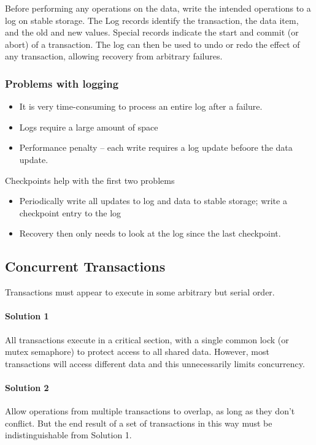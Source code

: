 \documentclass{article}
\begin{document}
Before performing any operations on the data, write the intended operations to a log on stable storage. The Log records identify the transaction, the data item, and the old and new values. Special records indicate the start and commit (or abort) of a transaction. The log can then be used to undo or redo the effect of any transaction, allowing recovery from arbitrary failures.

\subsubsection{Problems with logging}

\begin{itemize}
  \item It is very time-consuming to process an entire log after a failure.
  \item Logs require a large amount of space
  \item Performance penalty -- each write requires a log update befoore the data update.
\end{itemize}

Checkpoints help with the first two problems
\begin{itemize}
  \item Periodically write all updates to log and data to stable storage; write a checkpoint entry to the log
  \item Recovery then only needs to look at the log since the last checkpoint.
\end{itemize}

\subsection{Concurrent Transactions}

Transactions must appear to execute in some arbitrary but serial order.

\paragraph{Solution 1} All transactions execute in a critical section, with a single common lock (or mutex semaphore) to protect access to all shared data. However, most transactions will access different data and this unnecessarily limits concurrency.

\paragraph{Solution 2} Allow operations from multiple transactions to overlap, as long as they don't conflict. But the end result of a set of transactions in this way must be indistinguishable from Solution 1.
\end{document}
